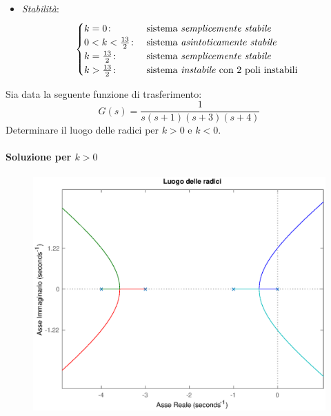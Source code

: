 \begin{esercizio}
\begin{itemize}
	\item \emph{Stabilità}:
		\[\begin{cases}
			k=0\colon & \text{sistema \emph{semplicemente stabile}} \\
			0<k<\frac{13}{2}\colon & \text{sistema \emph{asintoticamente stabile}} \\
			k=\frac{13}{2}\colon & \text{sistema \emph{semplicemente stabile}} \\
			k>\frac{13}{2}\colon & \text{sistema \emph{instabile} con 2 poli instabili}
		\end{cases}\]
\end{itemize}
\end{esercizio}

\begin{esercizio}
Sia data la seguente funzione di trasferimento:
\[
	G(s) = \frac{1}{s(s+1)(s+3)(s+4)}
\]
Determinare il luogo delle radici per \(k>0\) e \(k<0\).

\paragraph{Soluzione per \(k > 0\)}

\begin{figure}[ht]
	\centering
	\includegraphics[scale=.6]{mod1/assets/rl_ex38}
\end{figure}


\end{esercizio}
